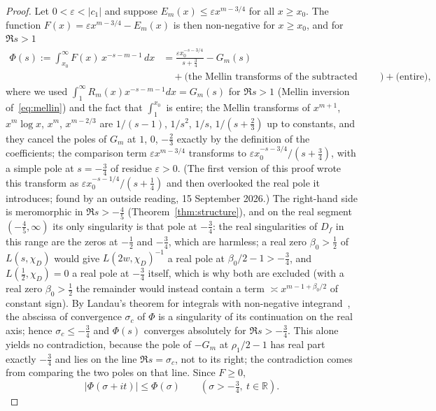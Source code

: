 \documentclass[11pt,a4paper]{article}
\theoremstyle{remark}\newtheorem{remark}[theorem]{Remark}
\begin{document}
\begin{proof}
Let $0<\varepsilon<|c_1|$ and suppose $E_m(x)\le\varepsilon x^{m-3/4}$ for all $x\ge x_0$. The function
$F(x)=\varepsilon x^{m-3/4}-E_m(x)$ is then non-negative for $x\ge x_0$, and for $\Re s>1$
\[
\begin{aligned}
\Phi(s):=\int_{x_0}^\infty F(x)\,x^{-s-m-1}\,dx&=\frac{\varepsilon x_0^{-s-3/4}}{s+\tfrac34}-G_m(s)\\
&\quad+\bigl(\text{the Mellin transforms of the subtracted terms}\bigr)+\bigl(\text{entire}\bigr),
\end{aligned}
\]
where we used $\int_1^\infty R_m(x)x^{-s-m-1}dx=G_m(s)$ for $\Re s>1$ (Mellin inversion of~\eqref{eq:mellin})
and the fact that $\int_1^{x_0}$ is entire; the Mellin transforms of $x^{m+1}$, $x^m\log x$, $x^m$, $x^{m-2/3}$
are $1/(s-1)$, $1/s^2$, $1/s$, $1/(s+\tfrac23)$ up to constants, and they cancel the poles of $G_m$ at $1$, $0$,
$-\tfrac23$ exactly by the definition of the coefficients; the comparison term $\varepsilon x^{m-3/4}$ transforms to
$\varepsilon x_0^{-s-3/4}/(s+\tfrac34)$, with a simple pole at $s=-\tfrac34$ of residue $\varepsilon>0$. (The first version
of this proof wrote this transform as $\varepsilon x_0^{-s-1/4}/(s+\tfrac14)$ and then overlooked the real pole it
introduces; found by an outside reading, 15 September 2026.) The right-hand side is meromorphic in
$\Re s>-\tfrac45$ (Theorem~\ref{thm:structure}), and on the real segment $(-\tfrac45,\infty)$ its only singularity is
that pole at $-\tfrac34$: the real singularities of $D_f$ in this range are the zeros at $-\tfrac12$ and $-\tfrac34$,
which are harmless; a real zero $\beta_0>\tfrac12$ of $L(s,\chi_D)$ would give $L(2w,\chi_D)^{-1}$ a real pole at
$\beta_0/2-1>-\tfrac34$, and $L(\tfrac12,\chi_D)=0$ a real pole at $-\tfrac34$ itself, which is why both are excluded
(with a real zero $\beta_0>\tfrac12$ the remainder would instead contain a term $\asymp x^{m-1+\beta_0/2}$ of constant sign).
By Landau's theorem for integrals with non-negative integrand~\cite[Theorem~1.7]{MontgomeryVaughan2007}, the abscissa
of convergence $\sigma_c$ of $\Phi$ is a singularity of its continuation on the real axis; hence $\sigma_c\le-\tfrac34$ and
$\Phi(s)$ converges absolutely for $\Re s>-\tfrac34$. This alone yields no contradiction, because the pole of $-G_m$ at
$\rho_1/2-1$ has real part exactly $-\tfrac34$ and lies on the line $\Re s=\sigma_c$, not to its right; the contradiction
comes from comparing the two poles on that line. Since $F\ge0$,
\[
|\Phi(\sigma+it)|\le\Phi(\sigma)\qquad(\sigma>-\tfrac34,\ t\in\mathbb R).
\]
\end{proof}
\end{document}
